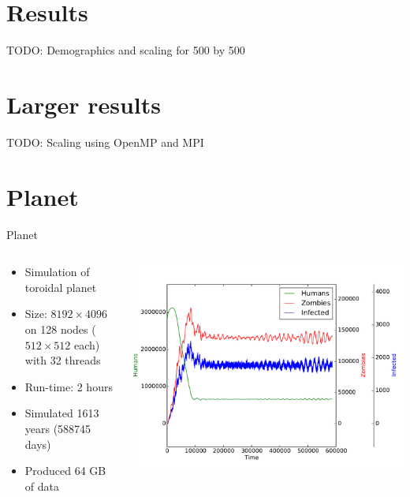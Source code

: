 \documentclass{beamer}
\newcommand{\todo}[1]{}
\renewcommand{\todo}[1]{{\color{red} TODO: {#1}}}
\begin{document}
\section{Results}

\begin{frame}
    \todo{Demographics and scaling for 500 by 500}
\end{frame}

\section{Larger results}

\begin{frame}
    \todo{Scaling using OpenMP and MPI}
\end{frame}

\section{Planet}

\begin{frame}{Planet}
    \begin{columns}
		\begin{column}{0.4\textwidth}
		    \begin{itemize}
		        \item Simulation of toroidal planet
		        \item Size: $8192 \times 4096$ on 128 nodes ($512 \times 512$ each) with 32 threads
		        \item Run-time: 2 hours
		        \item Simulated 1613 years (588745 days)
		        \item Produced 64 GB of data
		    \end{itemize}
		\end{column}
		\begin{column}{0.6\textwidth}
		    \includegraphics[width=\textwidth]{torus/planet.pdf}
		\end{column}
	\end{columns}
\end{frame}
\end{document}
